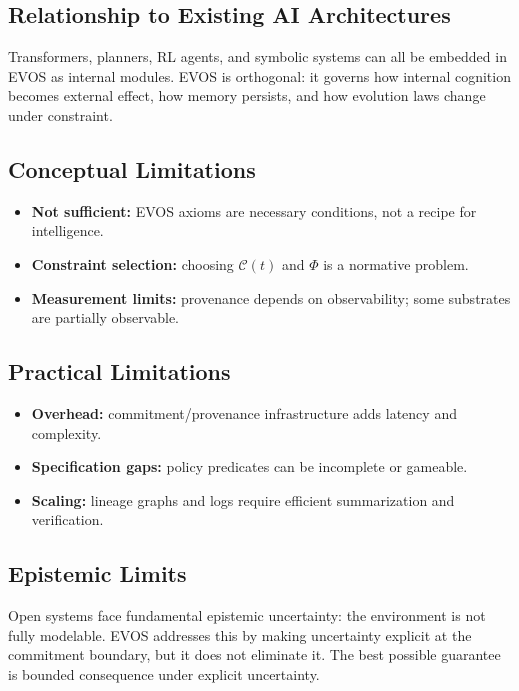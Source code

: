 \documentclass[11pt]{article}
\begin{document}
\subsection{Relationship to Existing AI Architectures}
\label{sec:relation-architectures}

Transformers, planners, RL agents, and symbolic systems can all be embedded in EVOS as internal
modules. EVOS is orthogonal: it governs how internal cognition becomes external effect, how
memory persists, and how evolution laws change under constraint.

\subsection{Conceptual Limitations}
\label{sec:concept-limits}

\begin{itemize}
  \item \textbf{Not sufficient:} EVOS axioms are necessary conditions, not a recipe for intelligence.
  \item \textbf{Constraint selection:} choosing $\mathcal{C}(t)$ and $\Phi$ is a normative problem.
  \item \textbf{Measurement limits:} provenance depends on observability; some substrates are partially observable.
\end{itemize}

\subsection{Practical Limitations}
\label{sec:practical-limits}

\begin{itemize}
  \item \textbf{Overhead:} commitment/provenance infrastructure adds latency and complexity.
  \item \textbf{Specification gaps:} policy predicates can be incomplete or gameable.
  \item \textbf{Scaling:} lineage graphs and logs require efficient summarization and verification.
\end{itemize}

\subsection{Epistemic Limits}
\label{sec:epistemic-limits}

Open systems face fundamental epistemic uncertainty: the environment is not fully modelable.
EVOS addresses this by making uncertainty explicit at the commitment boundary, but it does not
eliminate it. The best possible guarantee is bounded consequence under explicit uncertainty.
\end{document}
